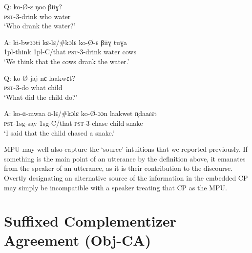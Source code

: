 \documentclass[output=paper
,newtxmath
,modfonts
,nonflat]{langsci/langscibook}
\begin{document}
\ea \label{MPU Examples} 
\begin{xlist}

\ex
\gll Q: ko-\O-ɛ ŋoo βiiɣ? \\
{} \textsc{pst}-3-drink who water \\
\glt \hspace{0.16in} `Who drank the water?'

\gll A: ki-bwɔɔti kɛ-lɛ/\#kɔlɛ ko-\O-ɛ βiiɣ tuɣa \\
{} 1pl-think 1pl-C/that \textsc{pst}-3-drink water cows \\
\glt \hspace{0.16in} `We think that the cows drank the water.'

\ex 
\gll Q: ko-\O-jaj nɛ laakwɛt? \\
{} \textsc{pst}-3-do what child \\
\glt \hspace{0.16in} `What did the child do?'

\gll A: ko-ɑ-mwaa ɑ-lɛ/\#kɔlɛ ko-\O-ɔɔn laakwet n̩daaɾɛt \\
{} \textsc{pst}-1sg-say 1sg-C/that \textsc{pst}-3-chase child snake \\
 \glt \hspace{0.16in} `I said that the child chased a snake.'

\end{xlist}
\z

\noindent MPU may well also capture the `source' intuitions that we reported previously. If something is the main point of an utterance by the definition above, it emanates from the speaker of an utterance, as it is their contribution to the discourse. Overtly designating an alternative source of the information in the embedded CP may simply be incompatible with a speaker treating that CP as the MPU. 



\section{Suffixed Complementizer Agreement (Obj-CA)} \label{ObjCASect}

\end{document}
